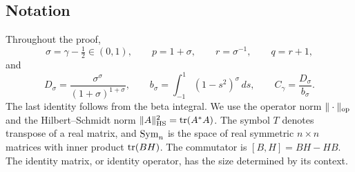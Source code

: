 \subsection{Notation}
Throughout the proof,
\begin{equation}\label{intro:parameters}
 \sigma=\gamma-\tfrac12\in(0,1),\qquad
 p=1+\sigma,\qquad r=\sigma^{-1},\qquad q=r+1,
\end{equation}
and
\begin{equation}\label{intro:constants}
 D_\sigma=\frac{\sigma^\sigma}{(1+\sigma)^{1+\sigma}},\qquad
 b_\sigma=\int_{-1}^1(1-s^2)^\sigma\,ds,\qquad
 C_\gamma=\frac{D_\sigma}{b_\sigma}.
\end{equation}
The last identity follows from the beta integral. We use the operator
norm $\|\cdot\|_{\operatorname{op}}$ and the Hilbert--Schmidt norm
$\|A\|_{\mathrm{HS}}^2=\operatorname{tr}(A^*A)$. The symbol $T$ denotes transpose of a real
matrix, and $\operatorname{Sym}_n$ is the space of real symmetric $n\times n$ matrices
with inner product $\operatorname{tr}(BH)$. The commutator is $[B,H]=BH-HB$.
The identity matrix, or identity operator, has the size determined by
its context.
